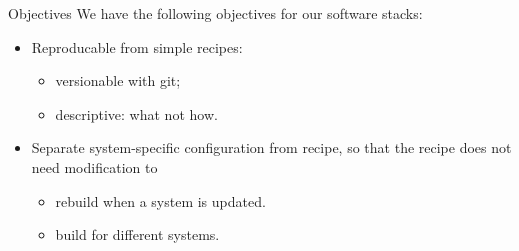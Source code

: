 \documentclass[aspectratio=43]{beamer}
\begin{document}
\begin{frame}[fragile]{Objectives}
    We have the following objectives for our software stacks:
    \begin{itemize}
        \item Reproducable from simple recipes:
        \begin{itemize}
            \item versionable with git;
            \item descriptive: what not how.
        \end{itemize}
        \item Separate system-specific configuration from recipe, so that the recipe does not need modification to
        \begin{itemize}
            \item rebuild when a system is updated.
            \item build for different systems.
        \end{itemize}
    \end{itemize}
\end{frame}
\end{document}
